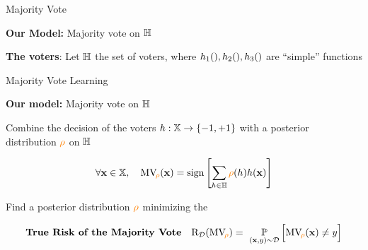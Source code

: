 \documentclass{slides}
\begin{document}
\begin{xframe}{Majority Vote}
   
    \vspace{0.3cm}
       
    \textbf{Our Model: }Majority vote on $\mathbb{H}$
    
    \vspace{0.3cm}


    \vspace{0.3cm}

    \begin{xblock}{}
      {\bf The voters}: Let $\mathbb{H}$ the set of voters, where $\textcolor{black}{\textcolor{black}{h}_1(), \textcolor{black}{h}_2(), \textcolor{black}{h}_3()}$ are ``simple'' functions
    \end{xblock}
    
    \vspace{0.3cm}
    

  \end{xframe}


\begin{xframe}{Majority Vote Learning}
    
    \vspace{0.3cm}
    
    \textbf{Our model: }Majority vote on $\mathbb{H}$
    
    \vspace{0.3cm}


    \vspace{0.3cm}
    
    \begin{xblock}{}
      Combine the decision of the voters $\textcolor{black}{h}: \mathbb{X} \to \{-1, +1\}$ with a posterior distribution $\textcolor{orange}{\rho}$ on $\mathbb{H}$
    \end{xblock}
        
    \vspace{-0.2cm}
    
    \begin{align*}
        \forall \mathbf{x}\in\mathbb{X},\quad \textcolor{black}{\text{MV}}_{\!\textcolor{orange}{\rho}}(\mathbf{x}) = \operatorname{sign}\left[ \sum_{\textcolor{black}{h}\in\mathbb{H}}\textcolor{orange}{\rho}(\textcolor{black}{h})\textcolor{black}{h}(\mathbf{x})\right]
    \end{align*}

    \begin{redbox}{}
    {\bf{}} Find a posterior distribution $\textcolor{orange}{\rho}$ minimizing the 

    \vspace{-0.6cm}
    \begin{align*}
    \text{\bf True Risk of the Majority Vote}\quad \Risk_{\D}(\MVQ) =\ \PP_{(\x, \y)\sim\D}\Big[   \MVQ(\x) \ne \y\Big]
    \end{align*}
    \end{redbox}
\end{xframe}
\end{document}
